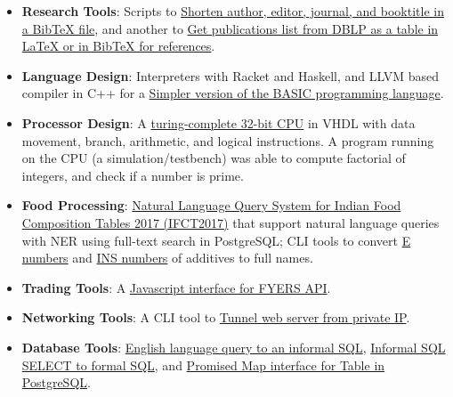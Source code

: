 \begin{itemize}[noitemsep, leftmargin=*]
  \item \textbf{Research Tools}:
    Scripts to \href{https://github.com/javascriptf/script-minify-bibtex}{Shorten author, editor, journal, and booktitle in a BibTeX file},
    and another to \href{https://github.com/javascriptf/script-publications-list}{Get publications list from DBLP as a table in LaTeX or in BibTeX for references}.
  \item \textbf{Language Design}:
    Interpreters with Racket and Haskell, and
    LLVM based compiler in C++ for a \href{https://github.com/compilerz/basic}{Simpler version of the BASIC programming language}.
  \item \textbf{Processor Design}:
    A \href{https://github.com/vhdlf/cpu_basic}{turing-complete 32-bit CPU} in VHDL with data movement, branch, arithmetic, and logical instructions. A program running on the CPU (a simulation/testbench) was able to compute factorial of integers, and check if a number is prime.
  \item \textbf{Food Processing}:
    \href{https://ifct2017.github.io}{Natural Language Query System for Indian Food Composition Tables 2017 (IFCT2017)} that support natural language queries with NER using full-text search in PostgreSQL;
    CLI tools to convert \href{https://github.com/nodef/food-e}{E numbers} and \href{https://github.com/nodef/food-ins}{INS numbers} of additives to full names.
  \item \textbf{Trading Tools}:
    A \href{https://github.com/nodef/extra-fyers}{Javascript interface for FYERS API}.
  \item \textbf{Networking Tools}:
    A CLI tool to \href{https://github.com/nodef/extra-tunnel}{Tunnel web server from private IP}.
  \item \textbf{Database Tools}:
    \href{https://github.com/nodef/pg-english}{English language query to an informal SQL},
    \href{https://github.com/nodef/pg-slang}{Informal SQL SELECT to formal SQL}, and
    \href{https://github.com/nodef/map-pg}{Promised Map interface for Table in PostgreSQL}.

\end{itemize}
